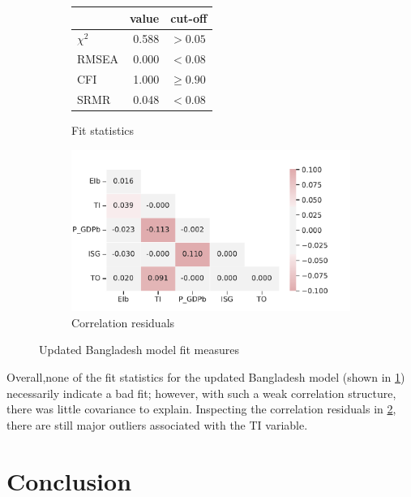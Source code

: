 \documentclass[11pt,a4paper]{article}
\begin{document}
\begin{figure}[tbp]
\begin{subfigure}{0.4\textwidth}
\centering
\begin{tabular}{lrl}
\toprule
{} &  value &      cut-off \\
\midrule
$\chi^2$ &  0.588 &     $> 0.05$ \\
RMSEA    &  0.000 &      $<0.08$ \\
CFI      &  1.000 &  $\geq 0.90$ \\
SRMR     &  0.048 &      $<0.08$ \\
\bottomrule
\end{tabular}
\caption{Fit statistics}
\label{tab:updated_fit_statistics}
\end{subfigure}
\begin{subfigure}{0.6\textwidth}
\centering
\includegraphics[width=\textwidth]{./plots/updated_correlation_residuals.pdf}
\caption{Correlation residuals}
\label{fig:updated_fit_residuals}
\end{subfigure}
\caption{Updated Bangladesh model fit measures}
\label{fig:updated_fit}
\end{figure}

Overall,none of the fit statistics for the updated Bangladesh model (shown in \cref{tab:updated_fit_statistics}) necessarily indicate a bad fit; however, with such a weak correlation structure, there was little covariance to explain. Inspecting the correlation residuals in \cref{fig:updated_fit_residuals}, there are still major outliers associated with the TI variable.


\section{Conclusion}\label{sec:conclusion}
\end{document}
